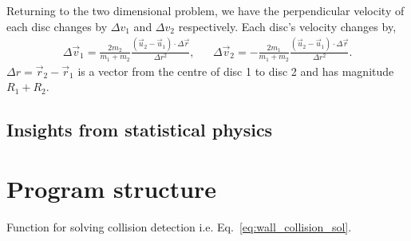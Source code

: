 \documentclass{article}
\begin{document}
Returning to the two dimensional problem, we have the perpendicular velocity of each disc changes by $\Delta v_1$ and $\Delta v_2$ respectively. Each disc's velocity changes by,
\begin{align}
    \Delta \vec{v}_1
    =
    \frac{2m_2}{m_1 + m_2} \frac{(\vec{u}_2 - \vec{u}_1) \cdot \Delta \vec{r}}{\Delta r^2},
    &&
    \Delta \vec{v}_2
    =
    -\frac{2m_1}{m_1 + m_2} \frac{(\vec{u}_2 - \vec{u}_1) \cdot \Delta \vec{r}}{\Delta r^2}.
\end{align}
$\Delta r = \vec{r}_2 - \vec{r}_1$ is a vector from the centre of disc 1 to disc 2 and has magnitude $R_1 + R_2$. 

\subsection{Insights from statistical physics}

\section{Program structure}
Function for solving collision detection i.e. Eq.~\ref{eq:wall_collision_sol}.
\end{document}
